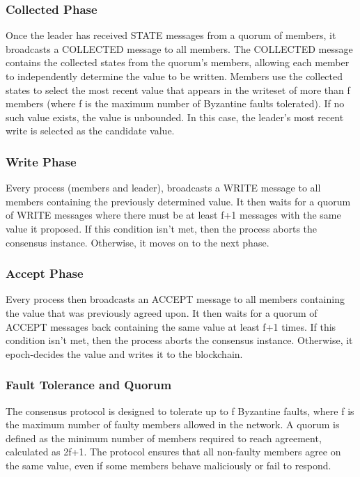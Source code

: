 \documentclass[runningheads]{llncs}
\begin{document}
\subsubsection{Collected Phase}
Once the leader has received STATE messages from a quorum of members, it
broadcasts a COLLECTED message to all members. The COLLECTED message contains
the collected states from the quorum's members, allowing each member to independently
determine the value to be written. Members use the collected states to select
the most recent value that appears in the writeset of more than f members (where
f is the maximum number of Byzantine faults tolerated). If no such value exists,
the value is unbounded. In this case, the leader's most recent write is selected 
as the candidate value.

\subsubsection{Write Phase}
Every process (members and leader), broadcasts a WRITE message to all members containing the
previously determined value. It then waits for a quorum of WRITE messages where there must
be at least f+1 messages with the same value it proposed. If this condition isn't met, then the process
aborts the consensus instance. Otherwise, it moves on to the next phase.

\subsubsection{Accept Phase}
Every process then broadcasts an ACCEPT message to all members containing the value that was
previously agreed upon. It then waits for a quorum of ACCEPT messages back
containing the same value at least f+1 times. If this condition isn't met, then the process
aborts the consensus instance. Otherwise, it epoch-decides the value and writes it to the blockchain.

\subsubsection{Fault Tolerance and Quorum}
The consensus protocol is designed to tolerate up to f Byzantine faults, where f
is the maximum number of faulty members allowed in the network. A quorum is
defined as the minimum number of members required to reach agreement, calculated
as 2f+1. The protocol
ensures that all non-faulty members agree on the same value, even if some
members behave maliciously or fail to respond.
\end{document}
